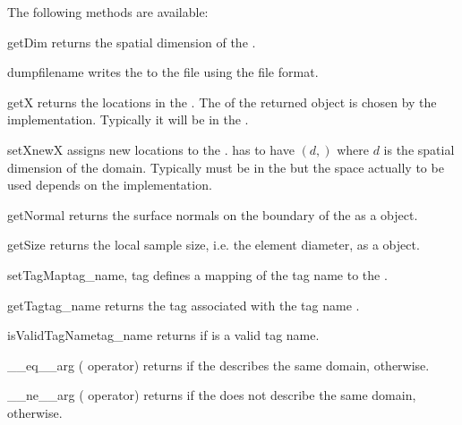 \vspace{1em}\noindent The following methods are available:
\begin{methoddesc}[Domain]{getDim}{}
    returns the spatial dimension of the \Domain.
\end{methoddesc}
%
\begin{methoddesc}[Domain]{dump}{filename}
    writes the \Domain to the file  using the \netCDF file format.
\end{methoddesc}
%
\begin{methoddesc}[Domain]{getX}{}
    returns the locations in the \Domain. The \FunctionSpace of the returned
    \Data object is chosen by the \Domain implementation. Typically it will be
    in the \Function.
\end{methoddesc}
%
\begin{methoddesc}[Domain]{setX}{newX}
    assigns new locations to the \Domain.  has to have \Shape $(d,)$
    where $d$ is the spatial dimension of the domain. Typically 
    must be in the \ContinuousFunction but the space actually to be used
    depends on the \Domain implementation.
\end{methoddesc}
%
\begin{methoddesc}[Domain]{getNormal}{}
    returns the surface normals on the boundary of the \Domain as a \Data object.
\end{methoddesc}
%
\begin{methoddesc}[Domain]{getSize}{}
    returns the local sample size, i.e. the element diameter, as a \Data object.
\end{methoddesc}
%
\begin{methoddesc}[Domain]{setTagMap}{tag_name, tag}
    defines a mapping of the tag name  to the .
\end{methoddesc}
%
\begin{methoddesc}[Domain]{getTag}{tag_name}
    returns the tag associated with the tag name .
\end{methoddesc}
%
\begin{methoddesc}[Domain]{isValidTagName}{tag_name}
    returns \True if  is a valid tag name.
\end{methoddesc}
%
\begin{methoddesc}[Domain]{__eq__}{arg}
    (\PYTHON \var{==} operator) returns \True if the \Domain {}
    describes the same domain, \False otherwise.
\end{methoddesc}
%
\begin{methoddesc}[Domain]{__ne__}{arg}
    (\PYTHON \var{!=} operator) returns \True if the \Domain {} does
    not describe the same domain, \False otherwise.
\end{methoddesc}
